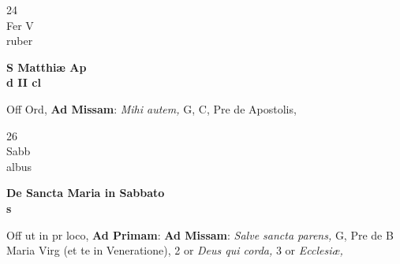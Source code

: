 \documentclass[10pt, openany]{book}
\begin{document}
        \begin{center}
            \begin{minipage}{3.5in}
                \vspace{2em}
                \begin{minipage}{0.5in}
                    {\Huge 24} \\
                    {\normalsize Fer V} \\
                    {\normalsize ruber}
                \end{minipage}
                \begin{minipage}{3.0in}
                    \textbf{ \large S Matthiæ Ap \\
                    \textnormal{\normalsize d II cl}} \\ 
                \end{minipage}
                \begin{justify}Off Ord, \textbf{Ad Missam}: \textit{Mihi autem,} G, C, Pre de Apostolis,   
                \end{justify}
            \end{minipage}
        \end{center}
    
        \begin{center}
            \begin{minipage}{3.5in}
                \vspace{2em}
                \begin{minipage}{0.5in}
                    {\Huge 26} \\
                    {\normalsize Sabb} \\
                    {\normalsize albus}
                \end{minipage}
                \begin{minipage}{3.0in}
                    \textbf{ \large De Sancta Maria in Sabbato \\
                    \textnormal{\normalsize s}} \\ 
                \end{minipage}
                \begin{justify}Off ut in pr loco, \textbf{Ad Primam}: \textbf{Ad Missam}: \textit{Salve sancta parens,} G, Pre de B Maria Virg (et te in Veneratione), 2 or \textit{Deus qui corda,} 3 or \textit{Ecclesiæ,}   
                \end{justify}
            \end{minipage}
        \end{center}
    
\end{document}

